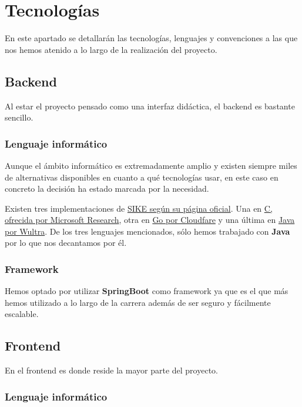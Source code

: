 \chapter{Tecnologías}\label{tecnologias}

En este apartado se detallarán las tecnologías, lenguajes y convenciones a las que nos hemos atenido a lo largo de la realización del proyecto.

\section{Backend}

Al estar el proyecto pensado como una interfaz didáctica, el backend es bastante sencillo.

\subsection{Lenguaje informático}

Aunque el ámbito informático es extremadamente amplio y existen siempre miles de alternativas disponibles en cuanto a qué tecnologías usar, en este caso en concreto la decisión ha estado marcada por la necesidad.

Existen tres implementaciones de \href{https://sike.org/}{SIKE según su página oficial}. Una en \href{https://github.com/Microsoft/PQCrypto-SIDH}{C, ofrecida por Microsoft Research}, otra en \href{https://github.com/cloudflare/circl/tree/master/dh/sidh}{Go por Cloudfare} y una última en \href{https://github.com/wultra/sike-java}{Java por Wultra}. De los tres lenguajes mencionados, sólo hemos trabajado con \textbf{Java} por lo que nos decantamos por él.

\subsection{Framework}

Hemos optado por utilizar \textbf{SpringBoot} como framework ya que es el que más hemos utilizado a lo largo de la carrera además de ser seguro y fácilmente escalable.


\section{Frontend}

En el frontend es donde reside la mayor parte del proyecto.

\subsection{Lenguaje informático}

